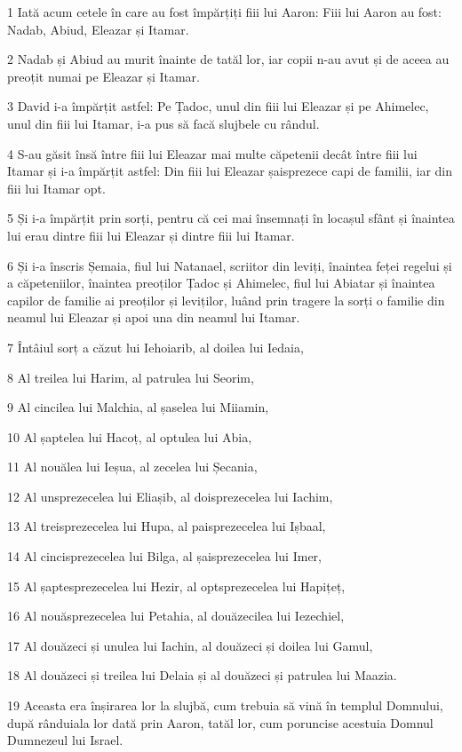 \par 1 Iată acum cetele în care au fost împărțiți fiii lui Aaron: Fiii lui Aaron au fost: Nadab, Abiud, Eleazar și Itamar.
\par 2 Nadab și Abiud au murit înainte de tatăl lor, iar copii n-au avut și de aceea au preoțit numai pe Eleazar și Itamar.
\par 3 David i-a împărțit astfel: Pe Țadoc, unul din fiii lui Eleazar și pe Ahimelec, unul din fiii lui Itamar, i-a pus să facă slujbele cu rândul.
\par 4 S-au găsit însă între fiii lui Eleazar mai multe căpetenii decât între fiii lui Itamar și i-a împărțit astfel: Din fiii lui Eleazar șaisprezece capi de familii, iar din fiii lui Itamar opt.
\par 5 Și i-a împărțit prin sorți, pentru că cei mai însemnați în locașul sfânt și înaintea lui erau dintre fiii lui Eleazar și dintre fiii lui Itamar.
\par 6 Și i-a înscris Șemaia, fiul lui Natanael, scriitor din leviți, înaintea feței regelui și a căpeteniilor, înaintea preoților Țadoc și Ahimelec, fiul lui Abiatar și înaintea capilor de familie ai preoților și leviților, luând prin tragere la sorți o familie din neamul lui Eleazar și apoi una din neamul lui Itamar.
\par 7 Întâiul sorț a căzut lui Iehoiarib, al doilea lui Iedaia,
\par 8 Al treilea lui Harim, al patrulea lui Seorim,
\par 9 Al cincilea lui Malchia, al șaselea lui Miiamin,
\par 10 Al șaptelea lui Hacoț, al optulea lui Abia,
\par 11 Al nouălea lui Ieșua, al zecelea lui Șecania,
\par 12 Al unsprezecelea lui Eliașib, al doisprezecelea lui Iachim,
\par 13 Al treisprezecelea lui Hupa, al paisprezecelea lui Ișbaal,
\par 14 Al cincisprezecelea lui Bilga, al șaisprezecelea lui Imer,
\par 15 Al șaptesprezecelea lui Hezir, al optsprezecelea lui Hapițeț,
\par 16 Al nouăsprezecelea lui Petahia, al douăzecilea lui Iezechiel,
\par 17 Al douăzeci și unulea lui Iachin, al douăzeci și doilea lui Gamul,
\par 18 Al douăzeci și treilea lui Delaia și al douăzeci și patrulea lui Maazia.
\par 19 Aceasta era înșirarea lor la slujbă, cum trebuia să vină în templul Domnului, după rânduiala lor dată prin Aaron, tatăl lor, cum poruncise acestuia Domnul Dumnezeul lui Israel.
